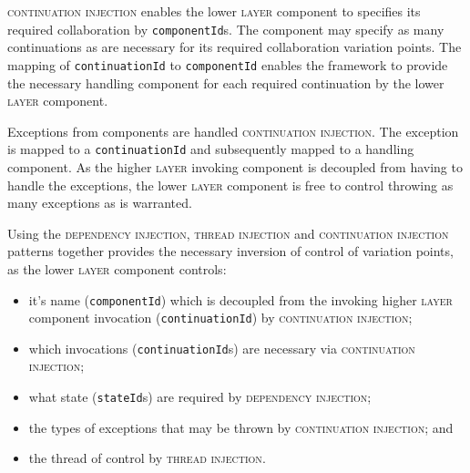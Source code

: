 \documentclass[prodmode]{style/acmlarge}
\begin{document}
\textsc{continuation injection} enables the lower \textsc{layer} component to
specifies its required collaboration by \texttt{componentId}s.  The component may
specify as many continuations as are necessary for its required
collaboration variation points.  The mapping of \texttt{continuationId} to
\texttt{componentId} enables the framework to provide the necessary handling
component for each required continuation by the lower \textsc{layer} component.

Exceptions from components are handled \textsc{continuation injection}.  The
exception is mapped to a \texttt{continuationId} and subsequently mapped to a
handling component.  As the higher \textsc{layer} invoking component is
decoupled from having to handle the exceptions, the lower \textsc{layer}
component is free to control throwing as many exceptions as is warranted.

Using the \textsc{dependency injection}, \textsc{thread injection} and
\textsc{continuation injection} patterns together provides the necessary inversion
of control of variation points, as the lower \textsc{layer} component controls:
\begin{itemize}
  \item it's name (\texttt{componentId}) which is decoupled from the invoking higher \textsc{layer} component invocation (\texttt{continuationId}) by \textsc{continuation injection};
  \item which invocations (\texttt{continuationId}s) are necessary via \textsc{continuation injection};
  \item what state (\texttt{stateId}s) are required by \textsc{dependency injection};
  \item the types of exceptions that may be thrown by \textsc{continuation injection}; and
  \item the thread of control by \textsc{thread injection}.
\end{itemize}
\end{document}
